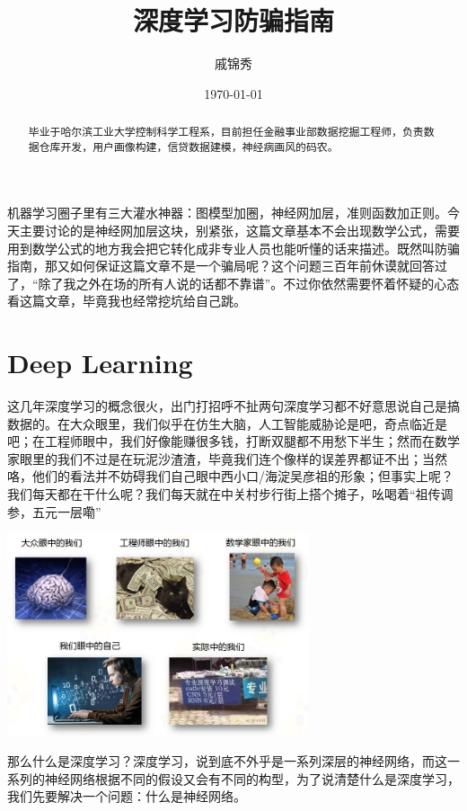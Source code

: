 \documentclass{article}
\title{深度学习防骗指南}
\author{戚锦秀}
\date{\today}
\begin{document}
\maketitle

\begin{abstract}
毕业于哈尔滨工业大学控制科学工程系，目前担任金融事业部数据挖掘工程师，负责数据仓库开发，用户画像构建，信贷数据建模，神经病画风的码农。
\end{abstract}

机器学习圈子里有三大灌水神器：图模型加圈，神经网加层，准则函数加正则。今天主要讨论的是神经网加层这块，别紧张，这篇文章基本不会出现数学公式，需要用到数学公式的地方我会把它转化成非专业人员也能听懂的话来描述。既然叫防骗指南，那又如何保证这篇文章不是一个骗局呢？这个问题三百年前休谟就回答过了，“除了我之外在场的所有人说的话都不靠谱”。不过你依然需要怀着怀疑的心态看这篇文章，毕竟我也经常挖坑给自己跳。



\section{Deep Learning}
这几年深度学习的概念很火，出门打招呼不扯两句深度学习都不好意思说自己是搞数据的。在大众眼里，我们似乎在仿生大脑，人工智能威胁论是吧，奇点临近是吧；在工程师眼中，我们好像能赚很多钱，打断双腿都不用愁下半生；然而在数学家眼里的我们不过是在玩泥沙渣渣，毕竟我们连个像样的误差界都证不出；当然咯，他们的看法并不妨碍我们自己眼中西小口/海淀吴彦祖的形象；但事实上呢？我们每天都在干什么呢？我们每天就在中关村步行街上搭个摊子，吆喝着“祖传调参，五元一层嘞”

\begin{center}
\includegraphics[width=3.5in]{image/image5.jpg}
\end{center}


那么什么是深度学习？深度学习，说到底不外乎是一系列深层的神经网络，而这一系列的神经网络根据不同的假设又会有不同的构型，为了说清楚什么是深度学习，我们先要解决一个问题：什么是神经网络。
\end{document}
